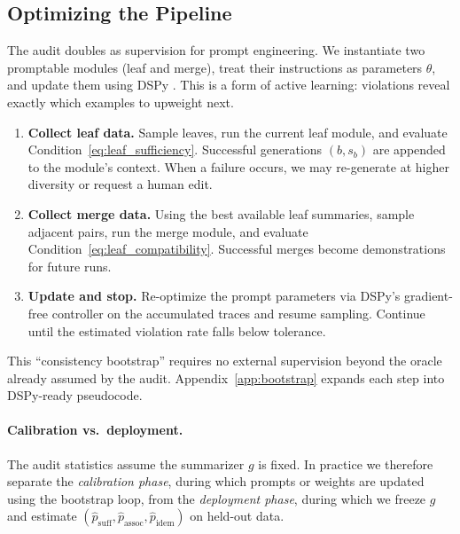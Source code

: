 \subsection{Optimizing the Pipeline}

The audit doubles as supervision for prompt engineering. We instantiate two promptable modules (leaf and merge), treat their instructions as parameters $\theta$, and update them using DSPy \citep{khattab2024dspy}. This is a form of active learning: violations reveal exactly which examples to upweight next.

\begin{enumerate}
    \item \textbf{Collect leaf data.} Sample leaves, run the current leaf module, and evaluate Condition~\eqref{eq:leaf_sufficiency}. Successful generations $(b, s_b)$ are appended to the module's context. When a failure occurs, we may re-generate at higher diversity or request a human edit.
    \item \textbf{Collect merge data.} Using the best available leaf summaries, sample adjacent pairs, run the merge module, and evaluate Condition~\eqref{eq:leaf_compatibility}. Successful merges become demonstrations for future runs.
    \item \textbf{Update and stop.} Re-optimize the prompt parameters via DSPy's gradient-free controller on the accumulated traces and resume sampling. Continue until the estimated violation rate falls below tolerance.
\end{enumerate}

This ``consistency bootstrap'' requires no external supervision beyond the oracle already assumed by the audit. Appendix~\ref{app:bootstrap} expands each step into DSPy-ready pseudocode.

\paragraph{Calibration vs.\ deployment.}
The audit statistics assume the summarizer $g$ is fixed. In practice we therefore separate the \emph{calibration phase}, during which prompts or weights are updated using the bootstrap loop, from the \emph{deployment phase}, during which we freeze $g$ and estimate $(\hat{p}_{\text{suff}},\hat{p}_{\text{assoc}},\hat{p}_{\text{idem}})$ on held-out data.
